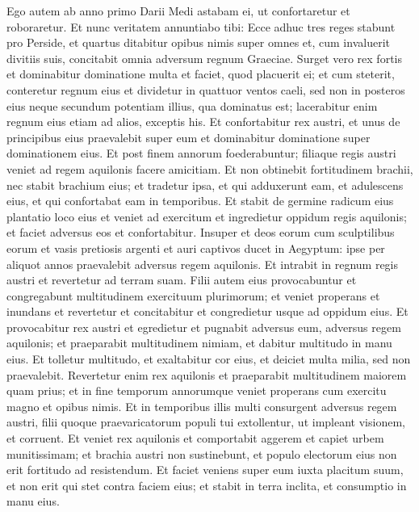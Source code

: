 \begin{biblechapter}  
\verse Ego autem ab anno primo Darii Medi astabam ei, ut confortaretur et roboraretur. 
\verse Et nunc veritatem annuntiabo tibi: Ecce adhuc tres reges stabunt pro Perside, et quartus ditabitur opibus nimis super omnes et, cum invaluerit divitiis suis, concitabit omnia adversum regnum Graeciae. 
\verse Surget vero rex fortis et dominabitur dominatione multa et faciet, quod placuerit ei; 
\verse et cum steterit, conteretur regnum eius et dividetur in quattuor ventos caeli, sed non in posteros eius neque secundum potentiam illius, qua dominatus est; lacerabitur enim regnum eius etiam ad alios, exceptis his.  
\verse Et confortabitur rex austri, et unus de principibus eius praevalebit super eum et dominabitur dominatione super dominationem eius. 
\verse Et post finem annorum foederabuntur; filiaque regis austri veniet ad regem aquilonis facere amicitiam. Et non obtinebit fortitudinem brachii, nec stabit brachium eius; et tradetur ipsa, et qui adduxerunt eam, et adulescens eius, et qui confortabat eam in temporibus. 
\verse Et stabit de germine radicum eius plantatio loco eius et veniet ad exercitum et ingredietur oppidum regis aquilonis; et faciet adversus eos et confortabitur. 
\verse Insuper et deos eorum cum sculptilibus eorum et vasis pretiosis argenti et auri captivos ducet in Aegyptum: ipse per aliquot annos praevalebit adversus regem aquilonis. 
\verse Et intrabit in regnum regis austri et revertetur ad terram suam. 
\verse Filii autem eius provocabuntur et congregabunt multitudinem exercituum plurimorum; et veniet properans et inundans et revertetur et concitabitur et congredietur usque ad oppidum eius. 
\verse Et provocabitur rex austri et egredietur et pugnabit adversus eum, adversus regem aquilonis; et praeparabit multitudinem nimiam, et dabitur multitudo in manu eius. 
\verse Et tolletur multitudo, et exaltabitur cor eius, et deiciet multa milia, sed non praevalebit. 
\verse Revertetur enim rex aquilonis et praeparabit multitudinem maiorem quam prius; et in fine temporum annorumque veniet properans cum exercitu magno et opibus nimis. 
\verse Et in temporibus illis multi consurgent adversus regem austri, filii quoque praevaricatorum populi tui extollentur, ut impleant visionem, et corruent. 
\verse Et veniet rex aquilonis et comportabit aggerem et capiet urbem munitissimam; et brachia austri non sustinebunt, et populo electorum eius non erit fortitudo ad resistendum. 
\verse Et faciet veniens super eum iuxta placitum suum, et non erit qui stet contra faciem eius; et stabit in terra inclita, et consumptio in manu eius. 

\end{biblechapter}
